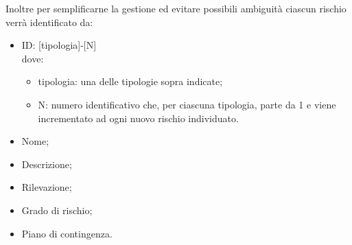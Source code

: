 Inoltre per semplificarne la gestione ed evitare possibili ambiguità ciascun rischio verrà identificato da:
\begin{itemize}
	\item ID: [tipologia]-[N] \\
		dove:
		\begin{itemize}
			\item tipologia: una delle tipologie sopra indicate;
			\item N: numero identificativo che, per ciascuna tipologia, parte da 1 e viene incrementato ad ogni nuovo rischio individuato.
		\end{itemize}
	\item Nome;
	\item Descrizione;
	\item Rilevazione;
	\item Grado di rischio;
	\item Piano di contingenza.
\end{itemize}

